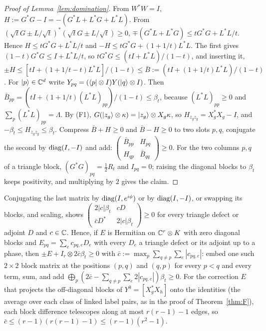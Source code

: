 \begin{proof}[Proof of Lemma~\ref{lem:domination}]
From $W^*W=I$, $H:=G^*G-I=-(G^*L+L^*G+L^*L)$. From $(\sqrt tG\pm L/\sqrt t)^*(\sqrt tG\pm L/\sqrt t)\ge0$, $\mp(G^*L+L^*G)\le tG^*G+L^*L/t$. Hence $H\le tG^*G+L^*L/t$ and
$-H\le tG^*G+(1+1/t)L^*L$. The first gives $(1-t)G^*G\le I+L^*L/t$, so $tG^*G\le(tI+L^*L)/(1-t)$, and inserting it,
$\pm H\le[tI+(1+1/t-t)L^*L]/(1-t)\le\bar B:=(tI+(1+1/t)L^*L)/(1-t)$. For $\lvert p\rangle\in\mathbb C^d$ write $Y_{pq}=(\langle p\rvert\otimes I)Y(\lvert q\rangle\otimes I)$. Then
$\bar B_{pp}=(tI+(1+1/t)(L^*L)_{pp})/(1-t)\le\beta_t$, because $(L^*L)_{pp}\ge0$ and $\sum_p(L^*L)_{pp}=\Lambda$. By (F1), $G(\lvert z_g\rangle\otimes\kappa)=\lvert z_g\rangle\otimes X_g\kappa$, so
$H_{z_gz_g}=X_g^*X_g-I$, and $-\beta_t\le H_{z_gz_g}\le\beta_t$. Compress $\bar B+H\ge0$ and $\bar B-H\ge0$ to two slots $p,q$, conjugate the second by $\operatorname{diag}(I,-I)$ and add:
$\left(\begin{smallmatrix}\bar B_{pp}&H_{pq}\\H_{qp}&\bar B_{qq}\end{smallmatrix}\right)\ge0$. For the two columns $p,q$ of a triangle block, $(G^*G)_{pq}=\frac12R_t$ and $I_{pq}=0$; raising
the diagonal blocks to $\beta_t$ keeps positivity, and multiplying by $2$ gives the claim.
\end{proof}

Conjugating the last matrix by $\operatorname{diag}(I,e^{i\phi})$ or by $\operatorname{diag}(I,-I)$, or swapping its blocks, and scaling, shows
$\left(\begin{smallmatrix}2|c|\beta_t&cD\\\bar cD^*&2|c|\beta_t\end{smallmatrix}\right)\ge0$ for every triangle defect or adjoint $D$ and $c\in\mathbb C$. Hence, if $E$ is Hermitian on
$\mathbb C^r\otimes K$ with zero diagonal blocks and $E_{pq}=\sum_ec_{pq,e}D_e$ with every $D_e$ a triangle defect or its adjoint up to a phase, then
$\pm E+I_r\otimes2\bar c\beta_t\ge0$ with $\bar c:=\max_p\sum_{q\ne p}\sum_e|c_{pq,e}|$: embed one such $2\times2$ block matrix at the positions $(p,q)$ and $(q,p)$ for every $p<q$ and every
term, sum, and add $\bigoplus_p(2\bar c-\sum_{q\ne p}\sum_e2|c_{pq,e}|)\beta_t\ge0$. For the correction $E$ that projects the off-diagonal blocks of $Y^0=[X_g^*X_h]$ onto the
identities (the average over each class of linked label pairs, as in the proof of Theorem~\ref{thm:F}), each block difference telescopes along at most $r(r-1)-1$ edges,
so $\bar c\le(r-1)(r(r-1)-1)\le(r-1)(r^2-1)$.

